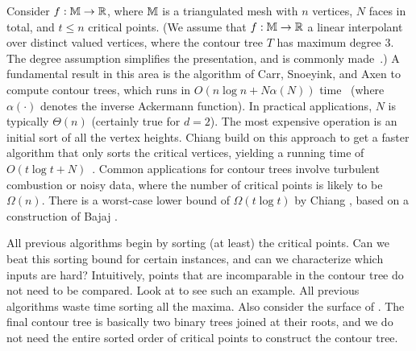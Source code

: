 Consider $f: \mathbb{M} \to \mathbb{R}$, where $\mathbb{M}$ is a triangulated mesh with $n$ vertices, $N$ faces in total, and $t \leq n$ critical points. 
(We assume that $f:\mathbb{M} \to \mathbb{R}$ a linear interpolant over distinct valued vertices, where the contour tree
$T$ has maximum degree $3$. The degree assumption simplifies the presentation, and is commonly made~\cite{kobps-ctsssit-97}.)
A fundamental result in this area is the algorithm of Carr, Snoeyink, and Axen to compute contour trees,
which runs in $O(n\log n + N\alpha(N))$ time~\cite{csa-cctad-00} (where $\alpha(\cdot)$ denotes the inverse
Ackermann function). In practical applications, $N$ is typically $\Theta(n)$
(certainly true for $d=2$). The most expensive operation is an initial sort of all the vertex
heights. Chiang \etal build on this approach to get a faster algorithm that only sorts the critical vertices,
yielding a running time of $O(t\log t + N)$~\cite{cllr-sooscctmp-05}.
Common applications for contour trees involve turbulent combustion or noisy data, where the number of critical points is likely to be $\Omega(n)$.
There is a worst-case
lower bound of $\Omega(t\log t)$ by Chiang \etal \cite{cllr-sooscctmp-05}, based on a construction of Bajaj \etal \cite{BaKr+98}.

All previous algorithms begin by sorting (at least) the critical points. Can we beat this sorting bound for certain instances,
and can we characterize which inputs are hard? Intuitively, points that are incomparable in the contour tree
do not need to be compared. Look at  to see such an example. All previous algorithms waste time
sorting all the maxima. Also consider the surface of . The final contour tree is basically two binary
trees joined at their roots, and we do not need the entire sorted order of critical points
to construct the contour tree. 

